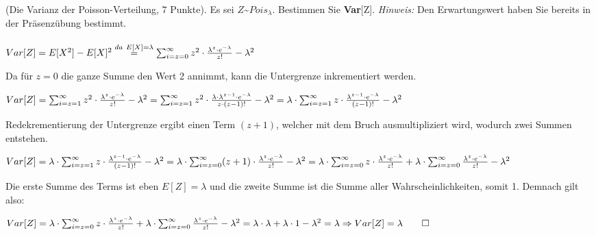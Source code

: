 \documentclass[twoside]{article}
\begin{document}
(Die Varianz der Poisson-Verteilung, 7 Punkte).
Es sei $Z$\textasciitilde$Pois_{\lambda}$.
Bestimmen Sie \textbf{Var}[Z].
\textit{Hinweis:} Den Erwartungswert haben Sie bereits in der Präsenzübung bestimmt.
\\\vspace{.3cm}\\
$Var[Z] = E[X^{2}]- E[X]^{2} \overset{da~E[X]=\lambda}{=} \sum_{i= z=0}^{\infty} z^{2}\cdot \frac{\lambda^{z}\cdot e^{-\lambda}}{z!} - \lambda^{2}$

Da für $z=0$ die ganze Summe den Wert 2 annimmt, kann die Untergrenze inkrementiert werden.

$Var[Z] = \sum_{i= z=1}^{\infty} z^{2}\cdot \frac{\lambda^{z}\cdot e^{-\lambda}}{z!} - \lambda^{2} = \sum_{i= z=1}^{\infty} z^{2}\cdot \frac{\lambda\cdot\lambda^{z-1}\cdot e^{-\lambda}}{z\cdot(z-1)!} - \lambda^{2} = \lambda \cdot \sum_{i= z=1}^{\infty} z\cdot \frac{\lambda^{z-1}\cdot e^{-\lambda}}{(z-1)!} - \lambda^{2}$

Redekrementierung der Untergrenze ergibt einen Term $(z+1)$, welcher mit dem Bruch ausmultipliziert wird, wodurch zwei Summen entstehen.

$Var[Z] = \lambda \cdot \sum_{i= z=1}^{\infty} z\cdot \frac{\lambda^{z-1}\cdot e^{-\lambda}}{(z-1)!} - \lambda^{2} = \lambda \cdot \sum_{i= z=0}^{\infty} (z+1) \cdot \frac{\lambda^{z}\cdot e^{-\lambda}}{z!} - \lambda^{2} = \lambda \cdot \sum_{i= z=0}^{\infty} z \cdot \frac{\lambda^{z}\cdot e^{-\lambda}}{z!} +  \lambda \cdot \sum_{i= z=0}^{\infty} \frac{\lambda^{z}\cdot e^{-\lambda}}{z!} - \lambda^{2}$

Die erste Summe des Terms ist eben $E[Z]=\lambda$ und die zweite Summe ist die Summe aller Wahrscheinlichkeiten, somit 1.
Demnach gilt also:

$Var[Z] = \lambda \cdot \sum_{i= z=0}^{\infty} z \cdot \frac{\lambda^{z}\cdot e^{-\lambda}}{z!} +  \lambda \cdot \sum_{i= z=0}^{\infty} \frac{\lambda^{z}\cdot e^{-\lambda}}{z!} - \lambda^{2} = \lambda \cdot \lambda + \lambda \cdot 1 - \lambda^{2}= \lambda \Rightarrow Var[Z]=\lambda \qed$
\end{document}
